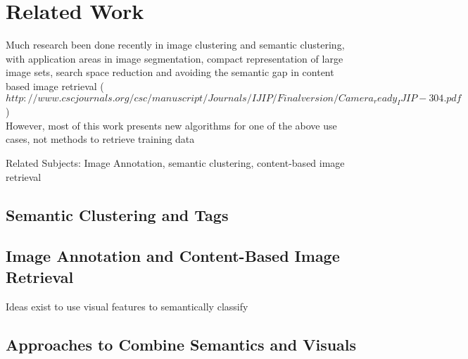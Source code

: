 %
\section{Related Work}
\label{sec_relatedwork}


Much research been done recently in image clustering and semantic clustering, with application areas in image segmentation, compact representation of large image sets, search space reduction and avoiding the semantic gap in content based image retrieval ($http://www.cscjournals.org/csc/manuscript/Journals/IJIP/Finalversion/Camera_ready_IJIP-304.pdf$) \\
However, most of this work presents new algorithms for one of the above use cases, not methods to retrieve training data

Related Subjects: Image Annotation, semantic clustering, content-based image retrieval

\subsection{Semantic Clustering and Tags}

\subsection{Image Annotation and Content-Based Image Retrieval}

Ideas exist to use visual features to semantically classify 

\subsection{Approaches to Combine Semantics and Visuals}
